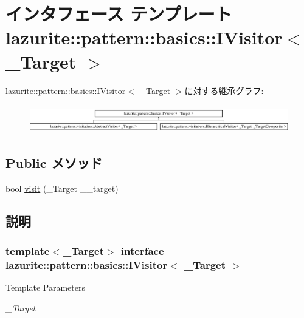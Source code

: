 \hypertarget{interfacelazurite_1_1pattern_1_1basics_1_1_i_visitor_3_01___target_01_4}{
\section{インタフェース テンプレート lazurite::pattern::basics::IVisitor$<$ \_\-Target $>$}
\label{interfacelazurite_1_1pattern_1_1basics_1_1_i_visitor_3_01___target_01_4}
}
lazurite::pattern::basics::IVisitor$<$ \_\-Target $>$に対する継承グラフ:\begin{figure}[H]
\begin{center}
\leavevmode
\includegraphics[height=1.24444cm]{interfacelazurite_1_1pattern_1_1basics_1_1_i_visitor_3_01___target_01_4}
\end{center}
\end{figure}
\subsection*{Public メソッド}
\begin{DoxyCompactItemize}
\item 
bool \hyperlink{interfacelazurite_1_1pattern_1_1basics_1_1_i_visitor_3_01___target_01_4_a9bf1df40e033ad9aec0a33bf6b426eca}{visit} (\_\-Target \_\-\_\-target)
\end{DoxyCompactItemize}


\subsection{説明}
\subsubsection*{template$<$\_\-Target$>$ interface lazurite::pattern::basics::IVisitor$<$ \_\-Target $>$}


\begin{DoxyTemplParams}{Template Parameters}
\item[{\em \_\-Target}]\end{DoxyTemplParams}


